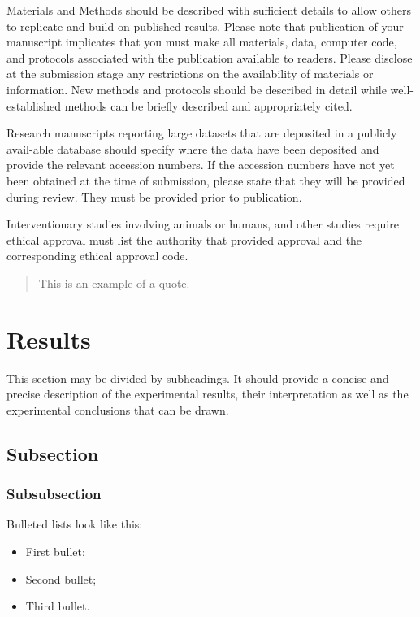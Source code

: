 Materials and Methods should be described with sufficient details to allow others to replicate and build on published results. Please note that publication of your manuscript implicates that you must make all materials, data, computer code, and protocols associated with the publication available to readers. Please disclose at the submission stage any restrictions on the availability of materials or information. New methods and protocols should be described in detail while well-established methods can be briefly described and appropriately cited.

Research manuscripts reporting large datasets that are deposited in a publicly avail-able database should specify where the data have been deposited and provide the relevant accession numbers. If the accession numbers have not yet been obtained at the time of submission, please state that they will be provided during review. They must be provided prior to publication.

Interventionary studies involving animals or humans, and other studies require ethical approval must list the authority that provided approval and the corresponding ethical approval code.
\begin{quote}
	This is an example of a quote.
\end{quote}

\section{Results}

This section may be divided by subheadings. It should provide a concise and precise description of the experimental results, their interpretation as well as the experimental conclusions that can be drawn.
\subsection{Subsection}
\subsubsection{Subsubsection}

Bulleted lists look like this:
\begin{itemize}
	\item	First bullet;
	\item	Second bullet;
	\item	Third bullet.
\end{itemize}


